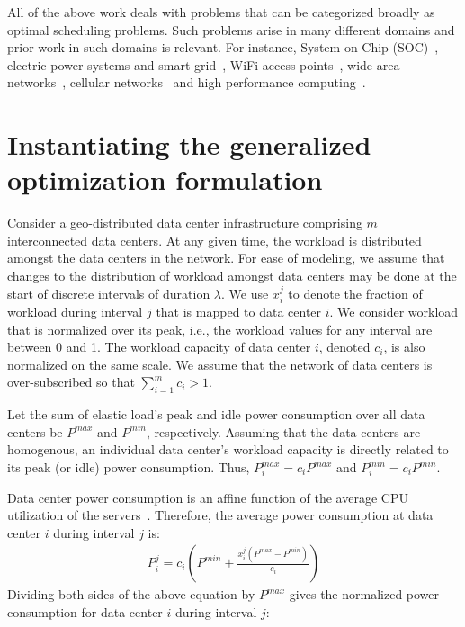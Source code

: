 All of the above work deals with problems that can be categorized broadly as optimal scheduling problems. Such problems arise in many different domains and prior work in such domains is relevant. For instance, System on Chip (SOC)~\cite{Fang:2011:COP:1995896.1995940}, electric power systems and smart grid~\cite{Javed:2008:ULP:1485753.1485792,Logenthiran2011138,Celli:2001:PICA,FahadJavedAdOpt.SASO.2009.26}, WiFi access points~\cite{Marsan:2010:SAM:1791314.1791340}, wide area networks~\cite{Cavdar:2011:ECOC}, cellular networks~\cite{Peng:2011:TPS:2030613.2030628} and high performance computing~\cite{Lee:ServerConsolidation:2011:Globecom,Pinheiro01loadbalancing,Yao:DCPowerReduction:2012:INFOCOM,Herodotou:Starfish:2011:CIDR,Herodotou:2011:NOS:2038916.2038934,Aikema:ElecCostHPC:2011:ISSST}.

\section{Instantiating the generalized optimization formulation}\label{sec:case1:instantiating} %
Consider a geo-distributed data center infrastructure
comprising $m$ interconnected data
centers. At any given time, the workload is distributed amongst the data
centers in the network. For ease of modeling, we assume that changes to the distribution of workload amongst data centers may be done at the start of discrete intervals of duration $\lambda$. We use $x_i^j$ to denote the fraction of workload during interval $j$ that is mapped to data center $i$.  We consider workload that is normalized over its peak, i.e., the workload values for any interval are between 0 and 1. The workload capacity of data center $i$, denoted $c_i$, is also normalized on the same scale. We assume that the network of data centers is over-subscribed so that $\sum_{i=1}^m c_i > 1$.

Let the sum of elastic load's peak and idle power consumption over all data centers be $P^{max}$ and $P^{min}$, respectively. Assuming that the data centers are homogenous, an individual data center's workload capacity is directly related to its peak (or idle) power consumption. Thus, $P_i^{max} = c_iP^{max}$ and $P_i^{min} = c_iP^{min}$. 

Data center power consumption is an affine function of the average CPU utilization of the servers~\cite{Fan:power:ICSA:2007}. Therefore, the average power consumption at data center $i$ during interval $j$ is: 
\begin{align}
P_i^j = c_i \left(P^{min}+\frac{x_i^j\left(P^{max}-P^{min}\right)}{c_i}\right)
\end{align}
Dividing both sides of the above equation by $P^{max}$ gives the normalized power consumption for data center $i$ during interval $j$:

